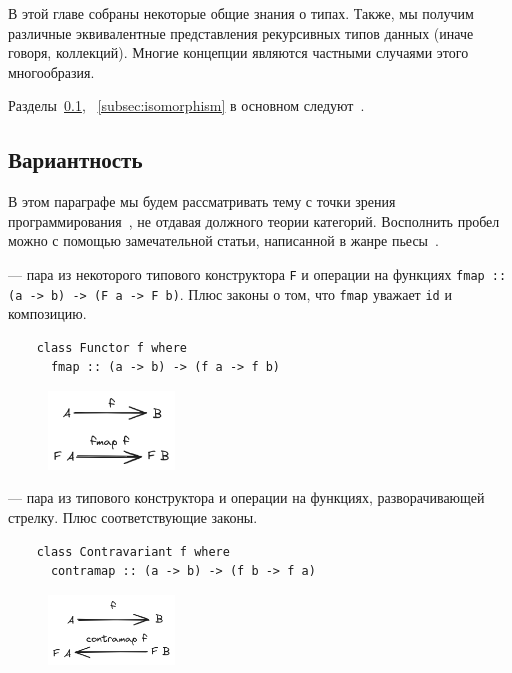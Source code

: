 
В этой главе собраны некоторые общие знания о типах.
Также, мы получим различные эквивалентные представления рекурсивных типов данных (иначе говоря, коллекций).
Многие концепции являются частными случаями этого многообразия.

Разделы~\ref{subsec:variance}, ~\ref{subsec:isomorphism} в основном следуют~\cite[глава 1]{maguire-types}.

\subsection{Вариантность} \label{subsec:variance}

В этом параграфе мы будем рассматривать тему с точки зрения программирования~\cite[глава 3]{maguire-types}, не отдавая должного теории категорий.
Восполнить пробел можно с помощью замечательной статьи, написанной в жанре пьесы~\cite{hinze2012functional}.

 --- пара из некоторого типового конструктора \texttt{F} и операции на функциях \texttt{fmap :: (a -> b) -> (F a -> F b)}.
Плюс законы о том, что \texttt{fmap} уважает \texttt{id} и композицию.

\begin{verbatim}
    class Functor f where
      fmap :: (a -> b) -> (f a -> f b)
\end{verbatim}

\begin{figure}[H]
    \centering
    \includegraphics[width=0.3\textwidth]{figs/functor}
\end{figure}

 --- пара из типового конструктора и операции на функциях, разворачивающей стрелку.
Плюс соответствующие законы.

\begin{verbatim}
    class Contravariant f where
      contramap :: (a -> b) -> (f b -> f a)
\end{verbatim}

\begin{figure}[H]
    \centering
    \includegraphics[width=0.3\textwidth]{figs/contra-functor}
\end{figure}

